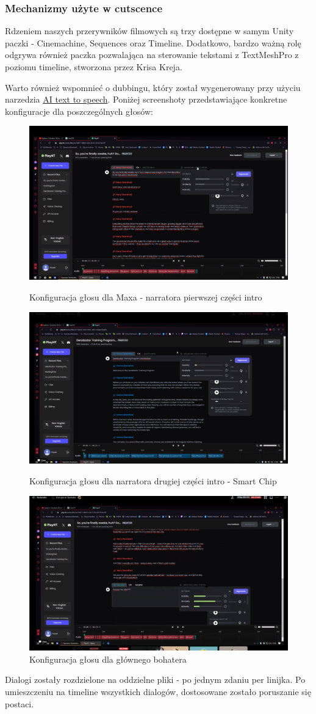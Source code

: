 \subsubsection{Mechanizmy użyte w cutscence}
Rdzeniem naszych przerywników filmowych są trzy dostępne w samym Unity paczki - Cinemachine, Sequences oraz  Timeline.
Dodatkowo, bardzo ważną rolę odgrywa również paczka pozwalająca na sterowanie tekstami z TextMeshPro z poziomu timeline, stworzona przez Krisa Kreja.

Warto również wspomnieć o dubbingu, który został wygenerowany przy użyciu narzedzia \href{https://play.ht/}{AI text to speech}.
Poniżej screenshoty przedstawiające konkretne konfiguracje dla poszczególnych głosów:
\begin{figure}[h]
    \centering
    \includegraphics[width=0.5\linewidth]{Images/voice_max.PNG}
    \caption{Konfiguracja głosu dla Maxa - narratora pierwszej części intro}
    \label{fig:enter-label}
    \includegraphics[width=0.5\linewidth]{Images/voice_intro_chip.png}
    \caption{Konfiguracja głosu dla narratora drugiej części intro - Smart Chip}
    \label{fig:enter-label}
    \includegraphics[width=0.5\linewidth]{Images/voice_hero.PNG}
    \caption{Konfiguracja głosu dla głównego bohatera}
    \label{fig:enter-label}
\end{figure}
\FloatBarrier
Dialogi zostały rozdzielone na oddzielne pliki - po jednym zdaniu per linijka.
Po umieszczeniu na timeline wszystkich dialogów, dostosowane zostało poruszanie się postaci.
